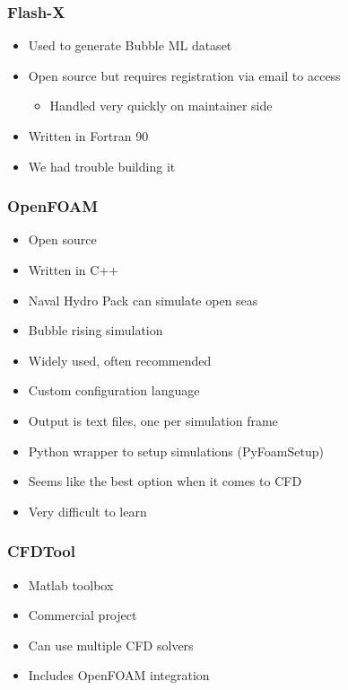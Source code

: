 \documentclass{beamer}
\begin{document}
\begin{frame}
    \frametitle{Flash-X}
    \begin{itemize}
        \item Used to generate Bubble ML dataset
        \item Open source but requires registration via email to access
            \begin{itemize}
                \item Handled very quickly on maintainer side
            \end{itemize}
        \item Written in Fortran 90
        \item We had trouble building it
    \end{itemize}
\end{frame}

\begin{frame}
    \frametitle{OpenFOAM}
    \begin{itemize}
        \item Open source
        \item Written in C++
        \item Naval Hydro Pack can simulate open seas
        \item Bubble rising simulation
        \item Widely used, often recommended
        \item Custom configuration language
        \item Output is text files, one per simulation frame
        \item Python wrapper to setup simulations (PyFoamSetup)
        \item Seems like the best option when it comes to CFD
        \item Very difficult to learn
    \end{itemize}
\end{frame}

\begin{frame}
    \frametitle{CFDTool}
    \begin{itemize}
        \item Matlab toolbox
        \item Commercial project
        \item Can use multiple CFD solvers
        \item Includes OpenFOAM integration
    \end{itemize}
\end{frame}
\end{document}
